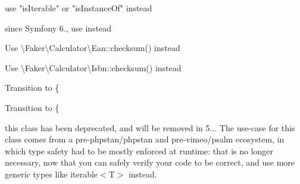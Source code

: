 \begin{DoxyRefList}
%
use "{}is\+Iterable"{} or "{}is\+Instance\+Of"{} instead 
\item[Global \doxylink{class_symfony_1_1_component_1_1_http_kernel_1_1_controller_1_1_argument_resolver_1_1_backed_enum_value_resolver_a6ec650d93faf4a03256428253dd7e013}{Backed\+Enum\+Value\+Resolver\+::supports} (Request \$request, Argument\+Metadata \$argument)]\label{deprecated__deprecated000333}%
%
since Symfony 6., use  instead  
\item[Global \doxylink{class_faker_1_1_provider_1_1_barcode_a3935d37cb6733ca975b4f6809efa78bd}{Barcode\+::ean\+Checksum} (\$input)]\label{deprecated__deprecated000016}%
%
Use \textbackslash{}\+Faker\textbackslash{}\+Calculator\textbackslash{}\+Ean\+::checksum() instead 
\item[Global \doxylink{class_faker_1_1_provider_1_1_barcode_a05730b7ee37602de6fa5825bd91d8867}{Barcode\+::isbn\+Checksum} (\$input)]\label{deprecated__deprecated000017}%
%
Use \textbackslash{}\+Faker\textbackslash{}\+Calculator\textbackslash{}\+Isbn\+::checksum() instead 
\item[Class \doxylink{class_ramsey_1_1_uuid_1_1_converter_1_1_number_1_1_big_number_converter}{Big\+Number\+Converter} ]\label{deprecated__deprecated000284}%
%
Transition to \{ 
\item[Class \doxylink{class_ramsey_1_1_uuid_1_1_converter_1_1_time_1_1_big_number_time_converter}{Big\+Number\+Time\+Converter} ]\label{deprecated__deprecated000286}%
%
Transition to \{ 
\item[Class \doxylink{class_ramsey_1_1_uuid_1_1_builder_1_1_builder_collection}{Builder\+Collection} ]\label{deprecated__deprecated000281}%
%
this class has been deprecated, and will be removed in 5... The use-\/case for this class comes from a pre-\/{\ttfamily phpstan/phpstan} and pre-\/{\ttfamily vimeo/psalm} ecosystem, in which type safety had to be mostly enforced at runtime\+: that is no longer necessary, now that you can safely verify your code to be correct, and use more generic types like {\ttfamily iterable\texorpdfstring{$<$}{<}T\texorpdfstring{$>$}{>}} instead. 
\item[Global \doxylink{namespace_carbon_1_1_traits_a071e711055126836a1291dc23f555d82}{Carbon\+::Traits\+::format\+Localized} (\$format)]\label{deprecated__deprecated000128}%

\end{DoxyRefList}
